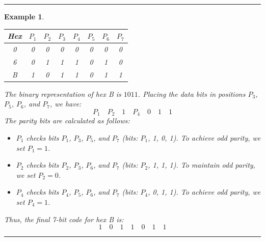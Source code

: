 \documentclass[12pt]{article}
\newtheorem{example}{Example}
\newenvironment{examp}
{\vspace{0.5cm}
 \hrule
\vspace{0.5cm}
\begin{example}}
{\hrule
\vspace{0.5cm}
\end{example}}
\begin{document}
\begin{examp}
	\begin{center} \begin{tabular}{|c|c|c|c|c|c|c|c|} \hline \textbf{Hex} & \( P_1
               \)                                      & \( P_2 \) & \( P_3 \) & \( P_4 \) & \( P_5 \) & \( P_6 \) & \( P_7 \) \\
               \hline
               0                                       & 0         & 0         & 0         & 0         & 0         & 0
                                                       & 0                                                                     \\
               6                                       & 0         & 1         & 1         & 1         & 0         & 1
                                                       & 0                                                                     \\ B            & 1         & 0         & 1
                                                       & 1         & 0         & 1         & 1                                 \\ \hline
		\end{tabular} \end{center} The binary representation of hex B is \(1011\).
	Placing the data bits in positions \( P_3 \), \( P_5 \), \( P_6 \), and \( P_7
	\), we have: \[ P_1 \quad P_2 \quad 1 \quad P_4 \quad 0 \quad 1 \quad 1 \] The
	parity bits are calculated as follows: \begin{itemize} \item \( P_1 \) checks
		      bits \( P_1 \), \( P_3 \), \( P_5 \), and \( P_7 \) (bits: \( P_1 \), 1, 0,
		      1). To achieve odd parity, we set \( P_1 = 1 \). \item \( P_2 \) checks bits
		      \( P_2 \), \( P_3 \), \( P_6 \), and \( P_7 \) (bits: \( P_2 \), 1, 1, 1).
		      To maintain odd parity, we set \( P_2 = 0 \). \item \( P_4 \) checks bits \(
		      P_4 \), \( P_5 \), \( P_6 \), and \( P_7 \) (bits: \( P_4 \), 0, 1, 1). To
		      achieve odd parity, we set \( P_4 = 1 \). \end{itemize}

	Thus, the final 7-bit code for hex B is: \[
		1 \quad 0 \quad 1 \quad 1 \quad 0 \quad 1 \quad 1 \] \end{examp}
\end{document}
